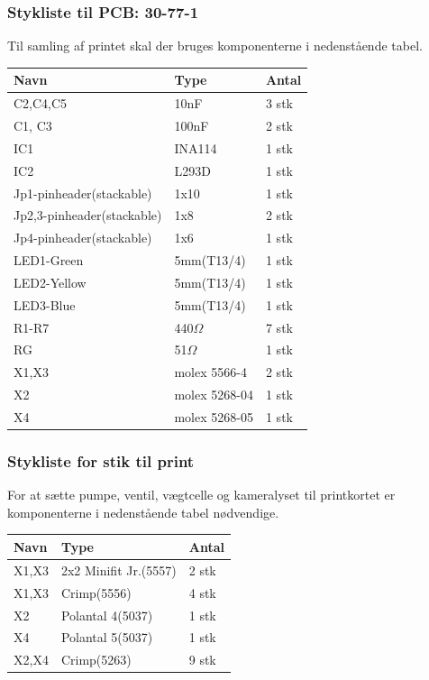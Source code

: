 \subsubsection{Stykliste til PCB: 30-77-1}
Til samling af printet skal der bruges komponenterne i nedenstående tabel. 
\begin{center}
		\begin{longtable}{ | m{6cm} | m{4cm}| m{2cm}| } 
			\hline
			\textbf{Navn} &\textbf{Type} & \textbf{Antal} \\ 
			\hline
			C2,C4,C5 & 10nF & 3 stk \\ 
			\hline
			C1, C3 & 100nF & 2 stk \\ 
			\hline
			IC1 & INA114 & 1 stk \\ 
			\hline
			IC2 & L293D & 1 stk \\ 
			\hline
			Jp1-pinheader(stackable) & 1x10 & 1 stk \\ 
			\hline
			Jp2,3-pinheader(stackable) & 1x8 & 2 stk \\ 
			\hline
			Jp4-pinheader(stackable) & 1x6 & 1 stk \\ 
			\hline
			LED1-Green & 5mm(T13/4) & 1 stk \\ 
			\hline	
			LED2-Yellow & 5mm(T13/4) & 1 stk \\ 
			\hline
			LED3-Blue & 5mm(T13/4) & 1 stk \\ 
			\hline
			R1-R7 & 440$\Omega$ & 7 stk \\ 
			\hline
			RG & 51$\Omega$ & 1 stk \\ 
			\hline
			X1,X3 & molex 5566-4 & 2 stk \\ 
			\hline
			X2 & molex 5268-04 & 1 stk \\ 
			\hline
			X4 & molex 5268-05 & 1 stk \\ 
			\hline
		\end{longtable}
\end{center}

\subsubsection{Stykliste for stik til print}
For at sætte pumpe, ventil, vægtcelle og kameralyset til printkortet er komponenterne i nedenstående tabel nødvendige. 
\begin{center}
		\begin{longtable}{ | m{6cm} | m{4cm}| m{2cm}| } 
			\hline
			\textbf{Navn} &\textbf{Type} & \textbf{Antal} \\ 
			\hline
			X1,X3 & 2x2 Minifit Jr.(5557) & 2 stk \\ 
			\hline
			X1,X3 & Crimp(5556) & 4 stk \\ 
			\hline
			X2 & Polantal 4(5037) & 1 stk \\ 
			\hline
			X4 & Polantal 5(5037) & 1 stk \\ 
			\hline
			X2,X4 & Crimp(5263) & 9 stk \\ 
			\hline
		\end{longtable}
\end{center}

 